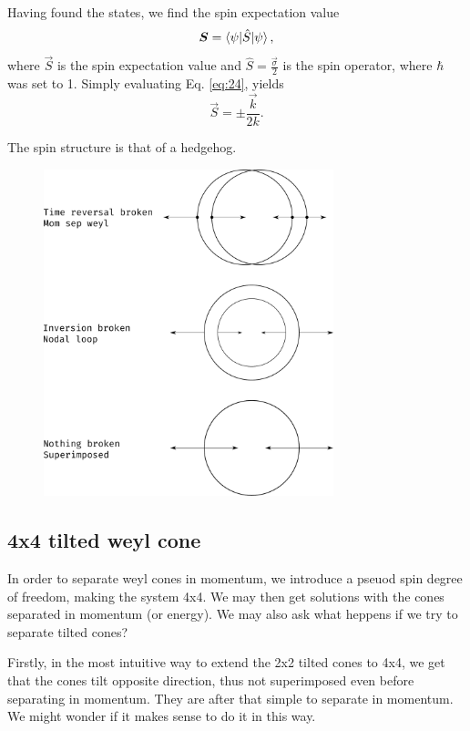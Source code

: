 Having found the states, we find the spin expectation value
\begin{equation}
  \label{eq:24}
  \bm{S} = \braket{\psi | \hat{S} | \psi },
\end{equation}
where \(\vec{S}\) is the spin expectation value and \(\hat{S} = \frac{\vec{\sigma}}{2} \) is the spin operator, where \(\hbar \) was set to 1.
Simply evaluating Eq. \eqref{eq:24}, yields
\begin{equation}
  \label{eq:25}
  \vec{S} = \pm \frac{\vec{k}}{2 k}.
\end{equation}

The spin structure is that of a hedgehog.

\begin{figure}[ht]
  \centering
  \includegraphics[width=0.75\textwidth]{figures/spinStructureWeyl}
  \caption{\label{fig:spinStructure} }
\end{figure}



\subsection{4x4 tilted weyl cone}
In order to separate weyl cones in momentum, we introduce a pseuod spin degree of freedom, making the system 4x4.
We may then get solutions with the cones separated in momentum (or energy).
We may also ask what heppens if we try to separate tilted cones?

Firstly, in the most intuitive way to extend the 2x2 tilted cones to 4x4, we get that the cones tilt opposite direction, thus not superimposed even before separating in momentum.
They are after that simple to separate in momentum.
We might wonder if it makes sense to do it in this way.

